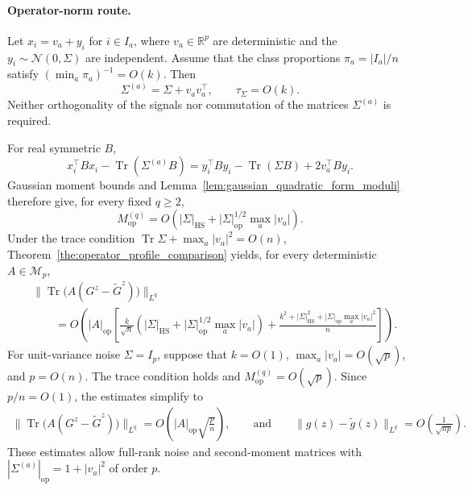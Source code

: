 \documentclass[EJP, preprint, NODS, nobera, nofontexpansion]{ejpecp}
\DeclareMathOperator{\op}{op}
\DeclareMathOperator{\tr}{Tr}
\DeclareMathOperator{\hs}{HS}
\begin{document}
\paragraph{Operator-norm route.}
\begin{example}
\label{exa:balanced_strong_signal_noise}
Let $x_i=v_a+y_i$ for $i\in I_a$, where $v_a\in\mathbb R^p$ are
deterministic and the $y_i\sim\mathcal N(0,\Sigma)$ are independent.
Assume that the class proportions $\pi_a=|I_a|/n$ satisfy
$(\min_a\pi_a)^{-1}=O(k)$. Then
\[
    \Sigma^{(a)}=\Sigma+v_av_a^\top,
    \qquad
    \tau_\Sigma=O(k).
\]
Neither orthogonality of the signals nor commutation of the
matrices $\Sigma^{(a)}$ is required.

For real symmetric $B$,
\[
    x_i^\top Bx_i-\tr(\Sigma^{(a)}B)
    =y_i^\top By_i-\tr(\Sigma B)+2v_a^\top By_i.
\]
Gaussian moment bounds and
Lemma~\ref{lem:gaussian_quadratic_form_moduli} therefore give,
for every fixed $q\geq2$,
\[
    M_{\op}^{(q)}
    =O\!\left(
        |\Sigma|_{\hs}
        +|\Sigma|_{\op}^{1/2}\max_a|v_a|
    \right).
\]
Under the trace condition
$\tr\Sigma+\max_a|v_a|^2=O(n)$,
Theorem~\ref{the:operator_profile_comparison} yields, for every
deterministic $A\in\mathcal M_p$,
\begin{align*}
    &\bigl\|\tr\bigl(A(G^z-\tilde G^z)\bigr)\bigr\|_{L^q}
    \\
    &\qquad=O\!\left(
        |A|_{\op}\left[
            \frac{k}{\sqrt n}
            \left(
                |\Sigma|_{\hs}
                +|\Sigma|_{\op}^{1/2}\max_a|v_a|
            \right)
            +\frac{
                k^2+|\Sigma|_{\hs}^2
                +|\Sigma|_{\op}\max_a|v_a|^2
            }{n}
        \right]
    \right).
\end{align*}
For unit-variance noise $\Sigma=I_p$, suppose that
$k=O(1)$, $\max_a|v_a|=O(\sqrt p)$, and $p=O(n)$.
The trace condition holds and $M_{\op}^{(q)}=O(\sqrt p)$.
Since $p/n=O(1)$, the estimates simplify to
\begin{align*}
    \bigl\|\tr\bigl(A(G^z-\tilde G^z)\bigr)\bigr\|_{L^q}
    =O\!\left(|A|_{\op}\sqrt{\frac pn}\right),
    \qquad \text{and}\qquad 
    \|g(z)-\tilde g(z)\|_{L^q}
    =O\!\left(\frac1{\sqrt{np}}\right).
\end{align*}
These estimates allow full-rank noise and second-moment matrices
with $|\Sigma^{(a)}|_{\op}=1+|v_a|^2$ of order $p$.
\end{example}
\end{document}
